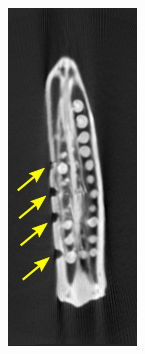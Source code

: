 \documentclass[journal]{IEEEtran}
\begin{document}
\begin{figure}[!h]
\begin{subfigure}[b]{0.18\linewidth}
\captionsetup{labelformat=empty}
        \caption{}
     \end{subfigure}
    \begin{subfigure}[b]{0.18\linewidth}
        \includegraphics[width=\textwidth]{../images/okra/template2_marked.png}

\end{subfigure}
\end{figure}
\end{document}
